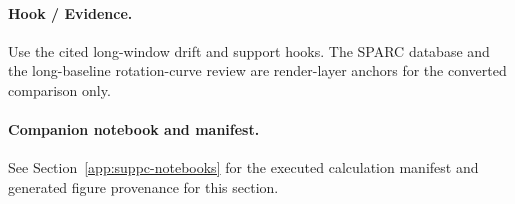 \FloatBarrier

\paragraph{Hook / Evidence.} Use the cited long-window drift and support hooks. The SPARC database and the long-baseline rotation-curve review are render-layer anchors for the converted comparison only.

\paragraph{Companion notebook and manifest.} See Section~\ref{app:suppc-notebooks} for the executed calculation manifest and generated figure provenance for this section.

\begin{quote}\small{}\end{quote}
